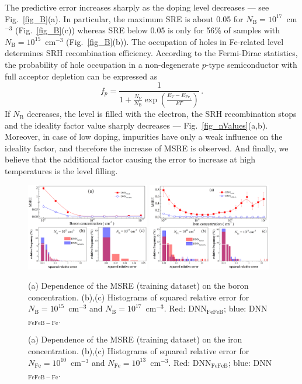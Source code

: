 \documentclass[num-refs]{wiley-article} %
\begin{document}
The predictive error increases sharply as the doping level decreases --- see Fig.~\ref{fig_B}(a).
In particular,  the maximum SRE is about 0.05 for $N_\mathrm{B}=10^{17}$~cm$^{-3}$ (Fig.~\ref{fig_B}(c))
whereas SRE below 0.05 is only for 56\% of samples with $N_\mathrm{B}=10^{15}$~cm$^{-3}$ (Fig.~\ref{fig_B}(b)).
The occupation of holes in Fe-related level determines SRH recombination efficiency.
According to the Fermi-Dirac statistics,
the probability of hole occupation in a non-degenerate $p$-type semiconductor with full acceptor depletion can be expressed as
\begin{equation}
\label{eqfp}
 f_p=\frac{1}{1+\frac{N_V}{N_\mathrm{B}}\exp\left(\frac{E_V-E_{\mathrm{Fe}_i}}{kT}\right)}\,.
\end{equation}
If $N_\mathrm{B}$ decreases, the level is filled with the electron,
the SRH recombination stops
and the ideality factor value sharply decreases  --- Fig.~\ref{fig_nValues}(a,b).
Moreover, in case of low doping,   impurities have only a weak influence
on the ideality factor, and therefore the increase of MSRE is observed.
And finally, we believe that the additional factor causing the error to increase
at high temperatures is the level filling.


\begin{figure}[tb]
\centering
\includegraphics[width=0.48\textwidth]{Fig6} \hfill
\includegraphics[width=0.48\textwidth]{Fig7} \\
\parbox[t]{0.48\textwidth}
{\caption{(a) Dependence of the MSRE (training dataset) on the boron concentration.
(b),(c) Histograms of squared  relative error for $N_\mathrm{B}=10^{15}$~cm$^{-3}$ and $N_\mathrm{B}=10^{17}$~cm$^{-3}$.
Red: DNN$_\mathrm{FeFeB}$; blue: DNN$_\mathrm{FeFeB-Fe}$.
}
\label{fig_B}} \hfill
\parbox[t]{0.48\textwidth}{\caption{(a) Dependence of the MSRE (training dataset) on the iron concentration.
(b),(c) Histograms of squared  relative error for $N_\mathrm{Fe}=10^{10}$~cm$^{-3}$ and $N_\mathrm{Fe}=10^{13}$~cm$^{-3}$.
Red: DNN$_\mathrm{FeFeB}$; blue: DNN$_\mathrm{FeFeB-Fe}$.}
\label{fig_Fe}}
\end{figure}
\end{document}
